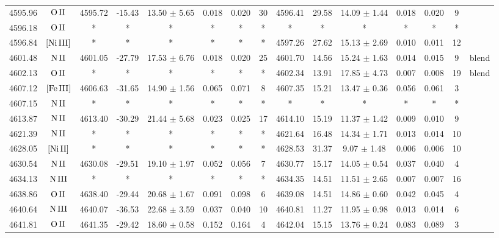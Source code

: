 \documentclass{article}
\begin{document}
\begin{table*}
\begin{adjustbox}{width=\textwidth}
\begin{tabular}{ccccccccccccccc}
4595.96 & $\mbox{O}\thinspace \mbox{II}$ & 4595.72 & -15.43 & 13.50 $\pm$ 5.65 & 0.018 & 0.020 & 30 & 4596.41 & 29.58 & 14.09 $\pm$ 1.44 & 0.018 & 0.020 & 9 &  \\
4596.18 & $\mbox{O}\thinspace \mbox{II}$ & * & * & * & * & * & * & * & * & * & * & * & * &  \\
4596.84 & $\mbox{[Ni}\thinspace \mbox{III]}$ & * & * & * & * & * & * & 4597.26 & 27.62 & 15.13 $\pm$ 2.69 & 0.010 & 0.011 & 12 &  \\
4601.48 & $\mbox{N}\thinspace \mbox{II}$ & 4601.05 & -27.79 & 17.53 $\pm$ 6.76 & 0.018 & 0.020 & 25 & 4601.70 & 14.56 & 15.24 $\pm$ 1.63 & 0.014 & 0.015 & 9 &  blend \\
4602.13 & $\mbox{O}\thinspace \mbox{II}$ & * & * & * & * & * & * & 4602.34 & 13.91 & 17.85 $\pm$ 4.73 & 0.007 & 0.008 & 19 &  blend \\
4607.12 & $\mbox{[Fe}\thinspace \mbox{III]}$ & 4606.63 & -31.65 & 14.90 $\pm$ 1.56 & 0.065 & 0.071 & 8 & 4607.35 & 15.21 & 13.47 $\pm$ 0.36 & 0.056 & 0.061 & 3 &  \\
4607.15 & $\mbox{N}\thinspace \mbox{II}$ & * & * & * & * & * & * & * & * & * & * & * & * &  \\
4613.87 & $\mbox{N}\thinspace \mbox{II}$ & 4613.40 & -30.29 & 21.44 $\pm$ 5.68 & 0.023 & 0.025 & 17 & 4614.10 & 15.19 & 11.37 $\pm$ 1.42 & 0.009 & 0.010 & 9 &  \\
4621.39 & $\mbox{N}\thinspace \mbox{II}$ & * & * & * & * & * & * & 4621.64 & 16.48 & 14.34 $\pm$ 1.71 & 0.013 & 0.014 & 10 &  \\
4628.05 & $\mbox{[Ni}\thinspace \mbox{II]}$ & * & * & * & * & * & * & 4628.53 & 31.37 & 9.07 $\pm$ 1.48 & 0.006 & 0.006 & 10 &  \\
4630.54 & $\mbox{N}\thinspace \mbox{II}$ & 4630.08 & -29.51 & 19.10 $\pm$ 1.97 & 0.052 & 0.056 & 7 & 4630.77 & 15.17 & 14.05 $\pm$ 0.54 & 0.037 & 0.040 & 4 &  \\
4634.13 & $\mbox{N}\thinspace \mbox{III}$ & * & * & * & * & * & * & 4634.35 & 14.51 & 11.51 $\pm$ 2.65 & 0.007 & 0.007 & 16 &  \\
4638.86 & $\mbox{O}\thinspace \mbox{II}$ & 4638.40 & -29.44 & 20.68 $\pm$ 1.67 & 0.091 & 0.098 & 6 & 4639.08 & 14.51 & 14.86 $\pm$ 0.60 & 0.042 & 0.045 & 4 &  \\
4640.64 & $\mbox{N}\thinspace \mbox{III}$ & 4640.07 & -36.53 & 22.68 $\pm$ 3.59 & 0.037 & 0.040 & 10 & 4640.81 & 11.27 & 11.95 $\pm$ 0.98 & 0.013 & 0.014 & 6 &  \\
4641.81 & $\mbox{O}\thinspace \mbox{II}$ & 4641.35 & -29.42 & 18.60 $\pm$ 0.58 & 0.152 & 0.164 & 4 & 4642.04 & 15.15 & 13.76 $\pm$ 0.24 & 0.083 & 0.089 & 3 &  \\

\end{tabular}
\end{adjustbox}
\end{table*}
\end{document}
